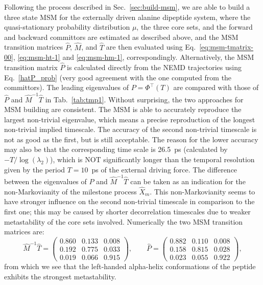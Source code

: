 \documentclass[aps, pre, preprint,unsortedaddress,a4paper,onecolumn,showkeys]{revtex4}
\newcommand{\myphi}{\Phi}
\begin{document}
Following the process described in Sec.~\ref{sec:build-msm}, we are able to build a 
three state MSM for the externally driven alanine dipeptide system,
where the quasi-stationary probability distribution $\mu$, the three core sets, and the forward and backward committors are
estimated as described above, and the MSM transition matrices $\hat P$, $\hat{M}$, and $\hat{T}$ are then evaluated using Eq.~\eqref{eq:msm-tmatrix-00}, \eqref{eq:msm-ht-1} and \eqref{eq:msm-hm-1}, correspondingly.
Alternatively, the MSM  transition matrix $\hat P$ is calculated directly from the NEMD trajectories using Eq.~\eqref{hatP_prob} (very good agreement with the one computed from the committors).
The leading eigenvalues of $P=\myphi^{\top}(T)$ are compared with those of $\hat P$ and $\hat{M}^{-1}\hat{T}$ in
Tab.~\ref{tab:tmp1}.
Without surprising, the two approaches for MSM building are consistent.
The MSM is able to accurately reproduce
the largest non-trivial eigenvalue, which means a precise reproduction
of the longest non-trivial implied timescale. The accuracy of the second non-trivial
timescale is not as good as the first, but is still acceptable.
The reason
for the lower accuracy may also be that
the corresponding time scale is 26.5~ps (calculated by $-T/\log(\lambda_2)$),
which is NOT significantly longer than the temporal resolution given by the period $T=10$~ps of the external driving force.
The difference between the eigenvalues of $\hat P$ and $\hat{M}^{-1}\hat T$
  can be taken as an indication for the non-Markovianity of the milestone process $\hat X_m$. This
  non-Markovianity seems to have stronger influence on the second non-trivial timescale in comparison to the first one; this may be caused by shorter decorrelation timescales due to weaker metastability of the core sets involved.
Numerically the two MSM transition matrices are:
\[
\hat{M}^{-1}\hat{T}=\left(\begin{array}{ccc}
   0.860 &   0.133 &   0.008 \\
    0.192  &  0.775  &  0.033\\
    0.019   & 0.066 &   0.915
\end{array}
\right),\qquad \hat{P}=\left(\begin{array}{ccc}
   0.882 &   0.110 &   0.008 \\
    0.158  &  0.815  &  0.028\\
    0.023   & 0.055 &   0.922
\end{array}
\right),
\]
from which we see that  the left-handed alpha-helix conformations of the peptide exhibits the strongest metastability. 
\end{document}
